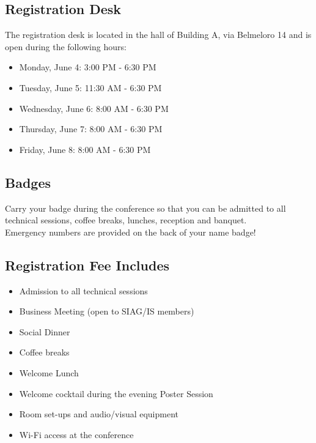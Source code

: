 \begin{multicols}{2}
\section*{Registration Desk}
The registration desk is located in the hall of Building A, via Belmeloro 14 and is open during the following hours:
\begin{itemize}
\item Monday, June 4: 3:00 PM - 6:30 PM
\item Tuesday, June 5: 11:30 AM - 6:30 PM
\item Wednesday, June 6: 8:00 AM - 6:30 PM
\item Thursday, June 7: 8:00 AM - 6:30 PM
\item Friday, June 8: 8:00 AM - 6:30 PM
\end{itemize}
\subsection*{Badges} Carry your badge during the conference so that you can be admitted to all technical sessions, coffee breaks, lunches, reception and banquet.\\
Emergency numbers are provided on the back of your name badge! 
\subsection*{Registration Fee Includes}
\begin{itemize}
\item Admission to all technical sessions
\item Business Meeting (open to SIAG/IS members)
\item Social Dinner
\item Coffee breaks 
\item Welcome Lunch 
\item Welcome cocktail during the evening Poster Session
\item Room set-ups and audio/visual equipment
\item Wi-Fi access at the conference
\end{itemize}%

\end{multicols}
